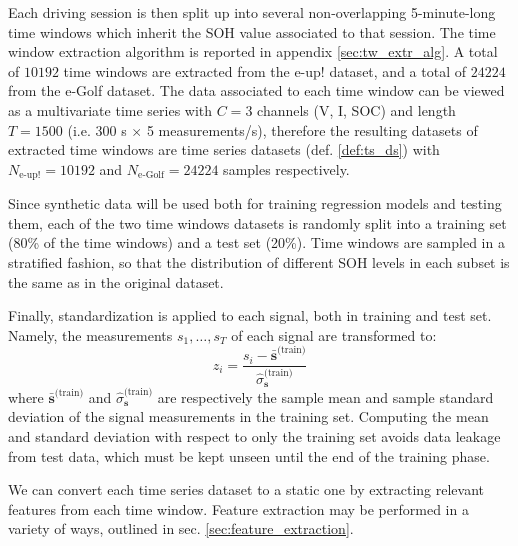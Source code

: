 Each driving session is then split up into several non-overlapping 5-minute-long time windows which inherit the SOH value associated to that session. The time window extraction algorithm is reported in appendix \ref{sec:tw_extr_alg}. A total of $10192$ time windows are extracted from the e-up! dataset, and a total of $24224$ from the e-Golf dataset. The data associated to each time window can be viewed as a multivariate time series with $C=3$ channels (V, I, SOC) and length $T=1500$ (i.e. 300 s $\times$ 5 measurements/s), therefore the resulting datasets of extracted time windows are time series datasets (def. \ref{def:ts_ds}) with $N_\text{e-up!}=10192$ and $N_\text{e-Golf}=24224$ samples respectively.

Since synthetic data will be used both for training regression models and testing them, each of the two time windows datasets is randomly split into a training set (80\% of the time windows) and a test set (20\%). Time windows are sampled in a stratified fashion, so that the distribution of different SOH levels in each subset is the same as in the original dataset.

Finally, standardization is applied to each signal, both in training and test set. Namely, the measurements $s_1,\dots,s_T$ of each signal are transformed to:
\begin{equation}
    z_i = \frac{s_i-\bar{\mathbf{s}}^\text{(train)}}{\hat{\sigma}_\mathbf{s}^\text{(train)}}
\label{eq:standardization}
\end{equation}
where $\bar{\mathbf{s}}^\text{(train)}$ and $\hat{\sigma}_\mathbf{s}^\text{(train)}$ are respectively the sample mean and sample standard deviation of the signal measurements in the training set. Computing the mean and standard deviation with respect to only the training set avoids data leakage from test data, which must be kept unseen until the end of the training phase.

We can convert each time series dataset to a static one by extracting relevant features from each time window. Feature extraction may be performed in a variety of ways, outlined in sec. \ref{sec:feature_extraction}.

